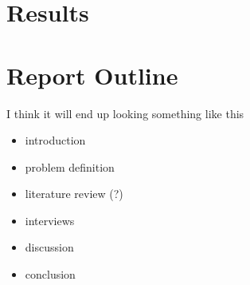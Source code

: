 \section{Results}

\section{Report Outline}
I think it will end up looking something like this
\begin{itemize}
    \item introduction
    \item problem definition
    \item literature review (?)
    \item interviews
    \item discussion
    \item conclusion
\end{itemize}